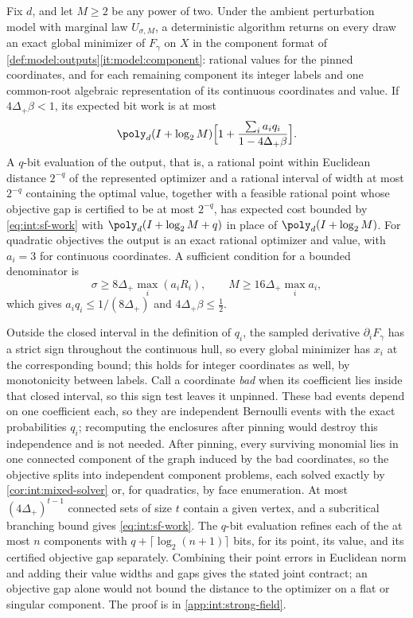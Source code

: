 \begin{theorem}\label{thm:int:strong-field}
Fix $d$, and let $M\ge2$ be any power of two. Under the ambient perturbation
model with marginal law $U_{\sigma,M}$, a deterministic algorithm returns on
every draw an exact global minimizer of $F_\gamma$ on $X$ in the component
format of \cref{def:model:outputs}\ref{it:model:component}: rational values
for the pinned coordinates, and for each remaining component its integer labels
and one common-root algebraic representation of its continuous coordinates and
value. If $4\Delta_+\beta<1$, its expected bit work is at most
\begin{equation}\label{eq:int:sf-work}
 \poly_d(I+\log_2M)\Bigl[1+\frac{\sum_ia_iq_i}{1-4\Delta_+\beta}\Bigr].
\end{equation}
A $q$-bit evaluation of the output, that is, a rational point within
Euclidean distance $2^{-q}$ of the represented optimizer and a rational
interval of width at most $2^{-q}$ containing the optimal value, together with
a feasible rational point whose objective gap is certified to be at most
$2^{-q}$, has expected cost bounded by \eqref{eq:int:sf-work} with
$\poly_d(I+\log_2M+q)$ in place of $\poly_d(I+\log_2M)$. For quadratic
objectives the output is an exact rational optimizer and value, with $a_i=3$
for continuous coordinates. A sufficient condition for a bounded denominator
is
\begin{equation}\label{eq:int:sf-regime}
 \sigma\ge8\Delta_+\max_i(a_iR_i),\qquad M\ge16\Delta_+\max_ia_i,
\end{equation}
which gives $a_iq_i\le1/(8\Delta_+)$ and $4\Delta_+\beta\le\frac12$.
\end{theorem}

Outside the closed interval in the definition of $q_i$, the sampled
derivative $\partial_iF_\gamma$ has a strict sign throughout the continuous
hull, so every global minimizer has $x_i$ at the corresponding bound; this
holds for integer coordinates as well, by monotonicity between labels. Call
a coordinate \emph{bad} when its coefficient lies inside that closed
interval, so this sign test leaves it unpinned. These bad events depend on
one coefficient each, so they are independent
Bernoulli events with the exact probabilities $q_i$; recomputing the
enclosures after pinning would destroy this independence and is not needed.
After pinning, every surviving monomial lies in one connected component of the
graph induced by the bad coordinates, so the objective splits into independent
component problems, each solved exactly by \cref{cor:int:mixed-solver} or, for
quadratics, by face enumeration. At most $(4\Delta_+)^{t-1}$ connected sets of
size $t$ contain a given vertex, and a subcritical branching bound gives
\eqref{eq:int:sf-work}. The $q$-bit evaluation refines each of the at most $n$
components with $q+\lceil\log_2(n+1)\rceil$ bits, for its point, its value,
and its certified objective gap separately. Combining their point errors
in Euclidean norm and adding their value widths and gaps gives the stated
joint contract; an objective gap alone would not bound the distance to the
optimizer on a flat or singular component. The proof is in
\cref{app:int:strong-field}.

